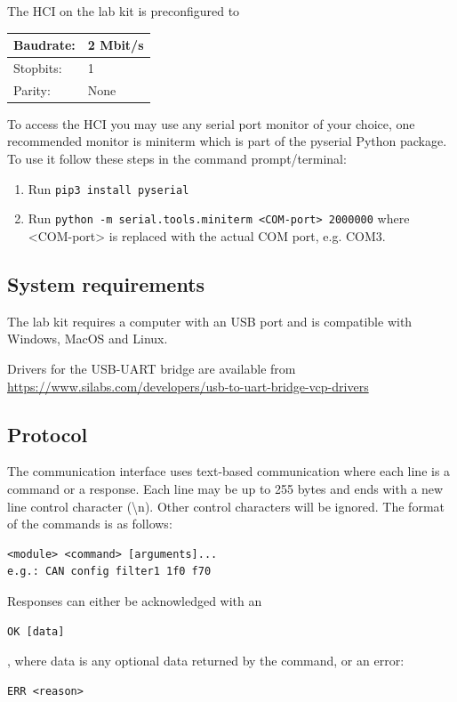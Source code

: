 \documentclass{article}[a4paper]
\begin{document}
The HCI on the lab kit is preconfigured to

\medskip
\noindent
\begin{tabularx}{\textwidth}{|p{3cm}|X|}
\hline
Baudrate: & 2 Mbit/s \\
\hline
Stopbits: & 1 \\
\hline
Parity: & None \\
\hline
\end{tabularx}

To access the HCI you may use any serial port monitor of your choice, one
recommended monitor is miniterm which is part of the pyserial Python package. To
use it follow these steps in the command prompt/terminal:

\begin{enumerate}
\item Run \texttt{pip3 install pyserial}
\item Run \texttt{python -m serial.tools.miniterm <COM-port> 2000000} where
      <COM-port> is replaced with the actual COM port, e.g. COM3.
\end{enumerate}

\subsection{System requirements}

The lab kit requires a computer with an USB port and is compatible with Windows,
MacOS and Linux.

Drivers for the USB-UART bridge are available from
\url{https://www.silabs.com/developers/usb-to-uart-bridge-vcp-drivers}

\subsection{Protocol}

The communication interface uses text-based communication where each line is a
command or a response. Each line may be up to 255 bytes and ends with a new
line control character
(\textbackslash n). Other control characters will be ignored. The format of
the commands is as follows:
\begin{verbatim}
<module> <command> [arguments]...
e.g.: CAN config filter1 1f0 f70
\end{verbatim}

Responses can either be acknowledged with an
\begin{verbatim}
OK [data]
\end{verbatim}
, where data is any optional data returned by the command, or an error:
\begin{verbatim}
ERR <reason>
\end{verbatim}
\end{document}
